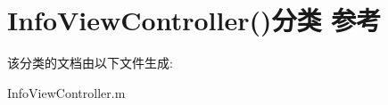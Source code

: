 \hypertarget{category_info_view_controller_07_08}{\section{Info\-View\-Controller()分类 参考}
\label{category_info_view_controller_07_08}
}


该分类的文档由以下文件生成\-:\begin{DoxyCompactItemize}
\item 
Info\-View\-Controller.\-m\end{DoxyCompactItemize}
